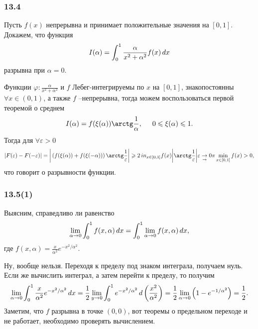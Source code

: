 \subsubsection*{13.4}

Пусть $f(x)$ непрерывна и принимает положительные значения на $[0, 1]$. Докажем, что функция 
\begin{equation*}
    I(\alpha) = \int_{0}^{1} \frac{\alpha}{x^2 + \alpha^2} f(x) \, d x
\end{equation*}
разрывна при $\alpha = 0$. 

Функции $\varphi \colon  \frac{\alpha}{x^2 + \alpha^2}$ и $f$ Лебег-интегрируемы по $x$ на $[0, 1]$, знакопостоянны $\forall x \in (0, 1)$, а также $f$ --непрерывна, тогда можем воспользоваться первой теоремой о среднем
\begin{equation*}
    I(\alpha) = f(\xi(\alpha)) \arctg \frac{1}{\alpha}, \hspace{5 mm} 0 \leq \xi(\alpha) \leq 1.
\end{equation*}
Тогда для $\forall \varepsilon > 0$
\begin{equation*}
    |F(\varepsilon) - F(-\varepsilon)| = \bigg|
        \left(
            f(\xi(\alpha)) + f(\xi(-\alpha))
        \right) \arctg \frac{1}{\varepsilon}
    \bigg| \geq 2 \,in_{x \in [0, 1]} f(x) \bigg|
        \arctg \frac{1}{\varepsilon}
    \bigg| \underset{\to}{\varepsilon \to 0} \pi \min_{x \in [0, 1]} f(x) > 0, 
\end{equation*}
что говорит о разрывности функции. 



\subsubsection*{13.5(1)}

Выясним, справедливо ли равенство 
\begin{equation*}
    \lim_{\alpha \to 0} \int_0^1 f(x, \alpha) \, d x = \int_0^1 \lim_{\alpha \to 0} f(x, \alpha) \, d x,
\end{equation*}
где $f(x, \alpha) = \frac{x}{\alpha^2}e^{-x^2/\alpha^2}$.

Ну, вообще нельзя. Переходя к пределу под знаком интеграла, получаем нуль. Если же вычислить интеграл, а затем перейти к пределу, то получим
\begin{equation*}
    \lim_{\alpha \to 0} \int_0^1 \frac{x}{\alpha^2} e^{-x^2/\alpha^2} \, d x = 
    \frac{1}{2} \lim_{y \to 0} \int_0^1 e^{-x^2/\alpha^2} \, d \left(
        \frac{x^2}{\alpha^2}
    \right) = \frac{1}{2} \lim_{\alpha \to 0} \left(
        1 - e^{-1/\alpha^2}
    \right) = \frac{1}{2}.
\end{equation*}
Заметим, что $f$ разрывна в точке $(0, 0)$, вот теоремы о предельном переходе и не работает, необходимо проверять вычислением.




